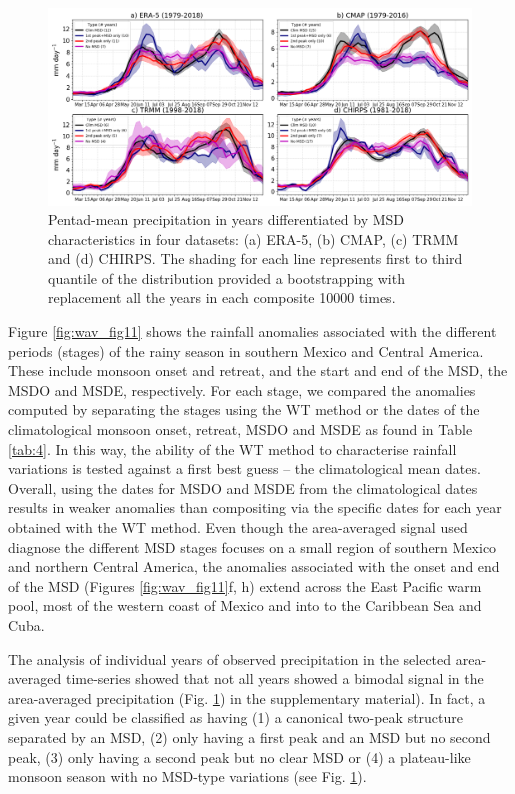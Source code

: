 \begin{figure}[t!]
 \noindent\includegraphics[width=\linewidth]{figures/wav_fig5c.png}
\caption[Seasonal cycle of precipitation for various MSD categories]{ Pentad-mean precipitation in years differentiated by MSD characteristics in four datasets: (a) ERA-5, (b) CMAP, (c) TRMM and (d) CHIRPS. The shading for each line represents first to third quantile of the distribution provided a bootstrapping with replacement all the years in each composite 10000 times.  }
\label{fig:S2}
\end{figure}

Figure \ref{fig:wav_fig11} shows the rainfall anomalies associated with the different periods (stages) of the rainy season in southern Mexico and Central America. These include monsoon onset and retreat, and the start and end of the MSD, the MSDO and MSDE, respectively. For each stage, we compared the anomalies computed by separating the stages using the WT method or the dates of the climatological monsoon onset, retreat, MSDO and MSDE as found in Table \ref{tab:4}. In this way, the ability of the WT method to characterise rainfall variations is tested against a first best guess -- the climatological mean dates. Overall, using the dates for MSDO and MSDE from the climatological dates results in weaker anomalies than compositing via the specific dates for each year obtained with the WT method.  Even though the area-averaged signal used diagnose the different MSD stages focuses on a small region of southern Mexico and northern Central America, the anomalies associated with the onset and end of the MSD (Figures \ref{fig:wav_fig11}f, h) extend across the East Pacific warm pool, most of the western coast of Mexico and into to the Caribbean Sea and Cuba. 

The analysis of individual years of observed precipitation in the selected area-averaged time-series showed that not all years showed a bimodal signal in the area-averaged precipitation (Fig. \ref{fig:S2}) in the supplementary material). In fact, a given year could be classified as having (1) a canonical two-peak structure separated by an MSD, (2) only having a first peak and an MSD but no second peak, (3) only having a second peak but no clear MSD or (4) a plateau-like monsoon season with no MSD-type variations (see Fig. \ref{fig:S2}). 


